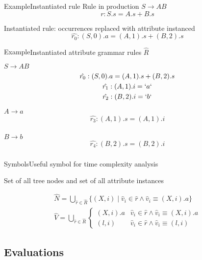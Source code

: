 \begin{frame}{Example}{Instantiated rule}
Rule in production $S \rightarrow A B$
\[ r: S.s = A.s + B.s  \]

Instantiated rule: occurrences replaced with \alert{attribute instanced}
\[ \hat{r_0}: (S, 0).a = (A, 1).s + (B,2).s  \]
\end{frame}

\begin{frame}{Example}{Instantiated attribute grammar rules $\hat{R}$}


{\small
$S \rightarrow A B$
\begin{gather*}
\hat{r_0}: (S, 0).a = (A, 1).s + (B,2).s \\
\hat{r_1}: (A, 1).i = `a` \\
\hat{r_2}: (B, 2).i = `b`
\end{gather*}

$A \rightarrow a$
\begin{gather*}
\hat{r_3}: (A,1).s = (A,1).i \\
\end{gather*}

$B \rightarrow b$
\begin{gather*}
\hat{r_4}: (B,2).s = (B,2).i \\
\end{gather*}
}



\end{frame}


\begin{frame}{Symbols}{Useful symbol for time complexity analysis}

Set of \alert{all tree nodes} and set of \alert{all attribute instances}

\begin{equation}
\begin{gathered}
    \hat{N} = \bigcup_{\hat r \in \hat R} \{ (X, i) \mid \hat v_i \in \hat r \wedge \hat v_i \equiv (X, i).a \}  \\
    \hat{V} = \bigcup_{\hat r \in \hat R} \begin{cases}
(X, i).a &  \hat v_i \in \hat r \wedge \hat v_i \equiv (X, i).a \\
(l, i)   &  \hat v_i \in \hat r \wedge \hat v_i \equiv (l, i) 
\end{cases}
\end{gathered}
\end{equation}
\end{frame}


\subsection*{Evaluations}

